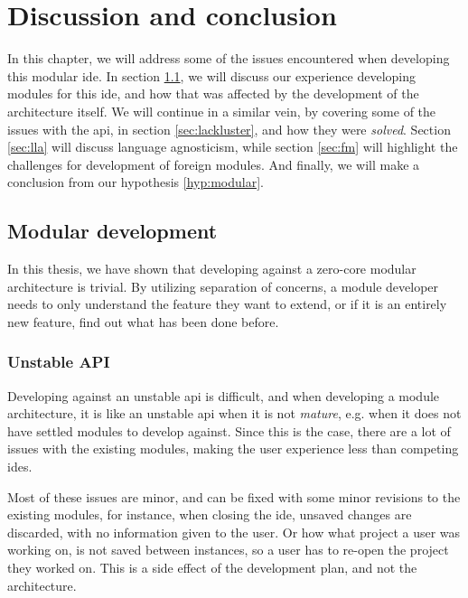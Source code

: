 \chapter{Discussion and conclusion} \label{cha:conclusion}

In this chapter, we will address some of the issues encountered when developing
this modular \gls*{ide}. In section \ref{sec:mod-dev}, we will discuss our
experience developing modules for this \gls*{ide}, and how that was affected by
the development of the architecture itself. We will continue in a similar vein,
by covering some of the issues with the \gls*{api}, in section
\ref{sec:lackluster}, and how they were \textit{solved}. Section \ref{sec:lla}
will discuss language agnosticism, while section \ref{sec:fm} will highlight the
challenges for development of foreign modules. And finally, we will make a
conclusion from our hypothesis \ref{hyp:modular}.


\section{Modular development} \label{sec:mod-dev}

In this thesis, we have shown that developing against a zero-core modular
architecture is trivial. By utilizing separation of concerns, a module developer
needs to only understand the feature they want to extend, or if it is an
entirely new feature, find out what has been done before.


\subsection{Unstable API}

Developing against an unstable \gls*{api} is difficult, and when developing a
module architecture, it is like an unstable \gls*{api} when it is not
\textit{mature}, e.g. when it does not have settled modules to develop against.
Since this is the case, there are a lot of issues with the existing modules,
making the user experience less than competing \gls*{ide}s.

Most of these issues are minor, and can be fixed with some minor revisions to
the existing modules, for instance, when closing the \gls*{ide}, unsaved changes
are discarded, with no information given to the user. Or how what project a user
was working on, is not saved between instances, so a user has to re-open the
project they worked on. This is a side effect of the development plan, and not
the architecture.

